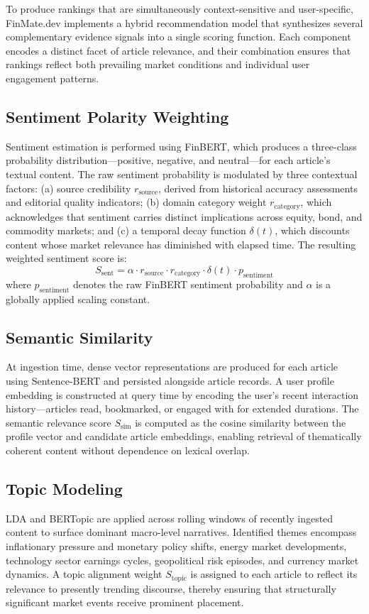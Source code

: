 \documentclass[conference]{IEEEtran}
\begin{document}
To produce rankings that are simultaneously context-sensitive and user-specific, FinMate.dev implements a hybrid recommendation model that synthesizes several complementary evidence signals into a single scoring function. Each component encodes a distinct facet of article relevance, and their combination ensures that rankings reflect both prevailing market conditions and individual user engagement patterns.

\subsection{Sentiment Polarity Weighting}
Sentiment estimation is performed using FinBERT, which produces a three-class probability distribution—positive, negative, and neutral—for each article's textual content. The raw sentiment probability is modulated by three contextual factors: (a) source credibility $r_{\text{source}}$, derived from historical accuracy assessments and editorial quality indicators; (b) domain category weight $r_{\text{category}}$, which acknowledges that sentiment carries distinct implications across equity, bond, and commodity markets; and (c) a temporal decay function $\delta(t)$, which discounts content whose market relevance has diminished with elapsed time. The resulting weighted sentiment score is:
\begin{equation}
S_{\text{sent}} = \alpha \cdot r_{\text{source}} \cdot r_{\text{category}} \cdot \delta(t) \cdot p_{\text{sentiment}}
\end{equation}
where $p_{\text{sentiment}}$ denotes the raw FinBERT sentiment probability and $\alpha$ is a globally applied scaling constant.

\subsection{Semantic Similarity}
At ingestion time, dense vector representations are produced for each article using Sentence-BERT \cite{reimers2019sbert} and persisted alongside article records. A user profile embedding is constructed at query time by encoding the user's recent interaction history—articles read, bookmarked, or engaged with for extended durations. The semantic relevance score $S_{\text{sim}}$ is computed as the cosine similarity between the profile vector and candidate article embeddings, enabling retrieval of thematically coherent content without dependence on lexical overlap.

\subsection{Topic Modeling}
LDA and BERTopic are applied across rolling windows of recently ingested content to surface dominant macro-level narratives. Identified themes encompass inflationary pressure and monetary policy shifts, energy market developments, technology sector earnings cycles, geopolitical risk episodes, and currency market dynamics. A topic alignment weight $S_{\text{topic}}$ is assigned to each article to reflect its relevance to presently trending discourse, thereby ensuring that structurally significant market events receive prominent placement.
\end{document}
